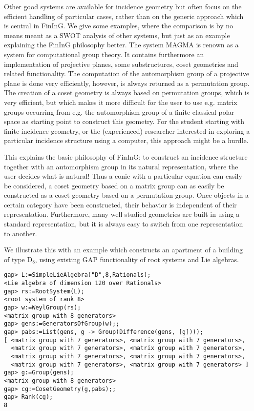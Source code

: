 \documentclass{article}
\def\fining{{\sf FinInG}}
\begin{document}
Other good systems are available for incidence geometry but often focus on the efficient handling of particular cases, rather than on the generic approach which is central in \fining.
We give some examples, where the comparison is by no means meant as a SWOT analysis of other systems, but just as an example
explaining the \fining{} philosophy better. The system {\sf MAGMA} \cite{magma} is renown as a system for computational group theory. It contains
furthermore an implementation of projective planes, some substructures, coset geometries and related functionality. The computation
of the automorphism group of a projective plane is done very efficiently, however, is always returned as a permutation group. The creation
of a coset geometry is always based on permutation groups, which is very efficient, but which makes it more difficult for the user to 
use e.g. matrix groups occurring from e.g. the automorphism group of a finite classical polar space as starting point to construct this geometry. For the student starting with finite incidence geometry, or the (experienced) researcher interested
in exploring a particular incidence structure using a computer, this approach might be a hurdle. 

This explains the basic philosophy of \fining{}: to construct an incidence structure together with an automorphism group 
in its natural representation, where the user decides what is natural! Thus a conic with a particular equation can easily be considered,
a coset geometry based on a matrix group can as easily be constructed as a coset geometry based on a permutation group. Once objects
in a certain category have been constructed, their behavior is independent of their representation. Furthermore, many well studied
geometries are built in using a standard representation, but it is always easy to switch from one representation to another.

We illustrate this with an example which constructs an apartment of a building of type $\mathrm{D}_8$, using existing GAP functionality of root systems and Lie algebras.
\begin{verbatim}
gap> L:=SimpleLieAlgebra("D",8,Rationals);
<Lie algebra of dimension 120 over Rationals>
gap> rs:=RootSystem(L);
<root system of rank 8>
gap> w:=WeylGroup(rs);
<matrix group with 8 generators>
gap> gens:=GeneratorsOfGroup(w);;
gap> pabs:=List(gens, g -> Group(Difference(gens, [g])));
[ <matrix group with 7 generators>, <matrix group with 7 generators>, 
  <matrix group with 7 generators>, <matrix group with 7 generators>, 
  <matrix group with 7 generators>, <matrix group with 7 generators>, 
  <matrix group with 7 generators>, <matrix group with 7 generators> ]
gap> g:=Group(gens);
<matrix group with 8 generators>
gap> cg:=CosetGeometry(g,pabs);;
gap> Rank(cg);
8
\end{verbatim}
\end{document}
